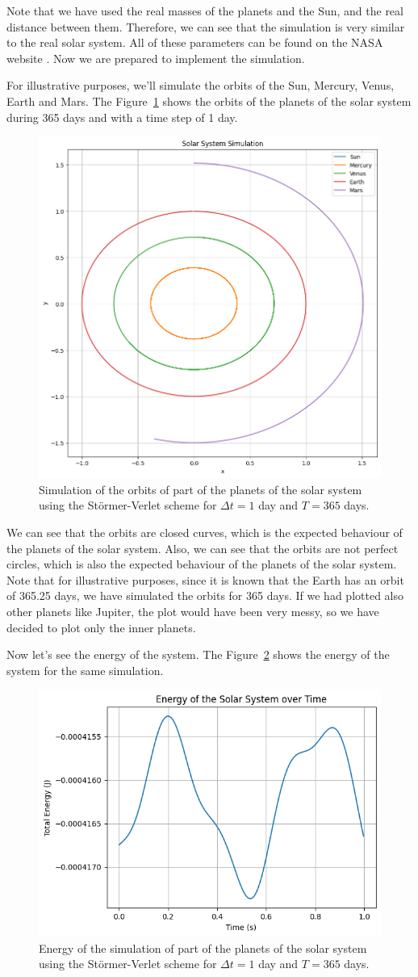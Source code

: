 \documentclass{report}
\begin{document}
Note that we have used the real masses of the planets and the Sun, and the real distance between them. Therefore, we can see that the simulation is very similar to the real solar system. All of these parameters can be found on the NASA website \cite{nssdc2022planetaryfactsheet}. Now we are prepared to implement the simulation. 

For illustrative purposes, we'll simulate the orbits of the Sun, Mercury, Venus, Earth and Mars. The Figure~\ref{fig:solarsystem} shows the orbits of the planets of the solar system during 365 days and with a time step of 1 day.

\begin{figure}[H]
	\centering
	\includegraphics[width=0.5\linewidth]{./Figures/SolarSystem/orbits.png}
	\caption{Simulation of the orbits of part of the planets of the solar system using the Störmer-Verlet scheme for \(\Delta t = 1\) day and \(T = 365\) days.}
	\label{fig:solarsystem}
\end{figure}

We can see that the orbits are closed curves, which is the expected behaviour of the planets of the solar system. Also, we can see that the orbits are not perfect circles, which is also the expected behaviour of the planets of the solar system. Note that for illustrative purposes, since it is known that the Earth has an orbit of 365.25 days, we have simulated the orbits for 365 days. If we had plotted also other planets like Jupiter, the plot would have been very messy, so we have decided to plot only the inner planets.

Now let's see the energy of the system. The Figure~\ref{fig:solarsystemenergy1} shows the energy of the system for the same simulation.

\begin{figure}[H]
	\centering
	\includegraphics[width=0.5\linewidth]{./Figures/SolarSystem/energy1.png}
	\caption{Energy of the simulation of part of the planets of the solar system using the Störmer-Verlet scheme for \(\Delta t = 1\) day and \(T = 365\) days.}
	\label{fig:solarsystemenergy1}
\end{figure}
\end{document}

